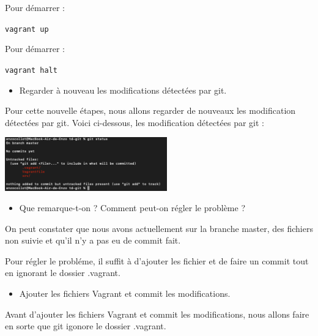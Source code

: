 \documentclass[12pt]{article}
\begin{document}
Pour démarrer : 

\texttt{vagrant up}

Pour démarrer : 

\texttt{vagrant halt}

\vspace{0.3cm}

\begin{itemize}
  \item Regarder à nouveau les modifications détectées par git.
\end{itemize}

Pour cette nouvelle étapes, nous allons regarder de nouveaux les modification détectées par git. Voici ci-dessous, les modification détectées par git : 

\vspace{0.3cm}

\begin{center}
  \includegraphics[width=7cm]{Image-TD-Git-1/git-status-2.png}
\end{center}

\vspace{0.3cm}

\begin{itemize}
  \item Que remarque-t-on ? Comment peut-on régler le problème ?
\end{itemize}

On peut constater que nous avons actuellement sur la branche master, des fichiers non suivie et qu'il n'y a pas eu de commit fait. \newline

Pour régler le probléme, il suffit à d'ajouter les fichier et de faire un commit tout en ignorant le dossier .vagrant.

\vspace{0.3cm}

\begin{itemize}
  \item Ajouter les fichiers Vagrant et commit les modifications.
\end{itemize}

Avant d'ajouter les fichiers Vagrant et commit les modifications, nous allons faire en sorte que git igonore le dossier .vagrant. \newline
\end{document}
